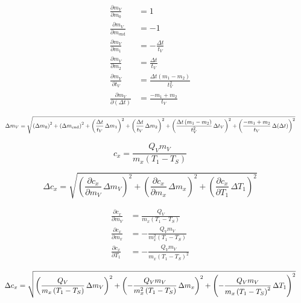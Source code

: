 \documentclass{article}
\begin{document}
  \begin{align}
    \frac{\partial m_V}{\partial m_{0}} &= 1 \\
    \frac{\partial m_V}{\partial m_\mathrm{end}} &= -1 \\
    \frac{\partial m_V}{\partial m_{1}} &= - \frac{\Delta t}{t_{V}} \\
    \frac{\partial m_V}{\partial m_{2}} &= \frac{\Delta t}{t_{V}} \\
    \frac{\partial m_V}{\partial t_{V}} &= \frac{\Delta t \left(m_{1} - m_{2}\right)}{t_{V}^{2}} \\
    \frac{\partial m_V}{\partial (\Delta t)} &= \frac{- m_{1} + m_{2}}{t_{V}}
  \end{align}

  \begin{equation}
	\resizebox{\textwidth}{!}{$\displaystyle
	\Delta m_V = \sqrt{\left(\Delta m_{0}\right)^2 + \left(\Delta m_\mathrm{end}\right)^2 + \left(\frac{\Delta t}{t_{V}}\,\Delta m_{1}\right)^2 + \left(\frac{\Delta t}{t_{V}}\,\Delta m_{2}\right)^2 + \left(\frac{\Delta t \left(m_{1} - m_{2}\right)}{t_{V}^{2}}\,\Delta t_{V}\right)^2 + \left(\frac{- m_{1} + m_{2}}{t_{V}}\,\Delta(\Delta t)\right)^2}
	$}
  \end{equation}

  \begin{equation} c_x = \frac{Q_{V} m_{V}}{m_{x} \left(T_{1} - T_{S}\right)} \end{equation}

  \begin{equation} \Delta c_x = \sqrt{\left(\frac{\partial c_x}{\partial m_{V}}\,\Delta m_{V}\right)^2 + \left(\frac{\partial c_x}{\partial m_{x}}\,\Delta m_{x}\right)^2 + \left(\frac{\partial c_x}{\partial T_{1}}\,\Delta T_{1}\right)^2} \end{equation}

  \begin{align}
    \frac{\partial c_x}{\partial m_{V}} &= \frac{Q_{V}}{m_{x} \left(T_{1} - T_{S}\right)} \\
    \frac{\partial c_x}{\partial m_{x}} &= - \frac{Q_{V} m_{V}}{m_{x}^{2} \left(T_{1} - T_{S}\right)} \\
    \frac{\partial c_x}{\partial T_{1}} &= - \frac{Q_{V} m_{V}}{m_{x} \left(T_{1} - T_{S}\right)^{2}}
  \end{align}

  \begin{equation}
	\resizebox{\textwidth}{!}{$\displaystyle
	\Delta c_x = \sqrt{\left(\frac{Q_{V}}{m_{x} \left(T_{1} - T_{S}\right)}\,\Delta m_{V}\right)^2 + \left(- \frac{Q_{V} m_{V}}{m_{x}^{2} \left(T_{1} - T_{S}\right)}\,\Delta m_{x}\right)^2 + \left(- \frac{Q_{V} m_{V}}{m_{x} \left(T_{1} - T_{S}\right)^{2}}\,\Delta T_{1}\right)^2}
	$}
  \end{equation}
\end{document}
